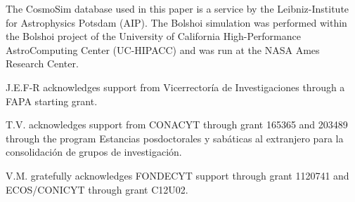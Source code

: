 \documentclass{emulateapj}
\begin{document}
The CosmoSim database used in this paper is a service by the
Leibniz-Institute for Astrophysics Potsdam (AIP). The  Bolshoi
simulation was performed within the Bolshoi project of the University
of California High-Performance AstroComputing Center (UC-HIPACC) and
was run at the NASA Ames Research Center. 

J.E.F-R acknowledges support from Vicerrector\'ia de
Investigaciones through a FAPA starting grant.

T.V. acknowledges support from CONACYT through grant 165365 and
203489 through the program Estancias posdoctorales y sab\'aticas al
extranjero para la consolidaci\'on de grupos de investigaci\'on.  

V.M. gratefully acknowledges FONDECYT support through grant 1120741
and ECOS/CONICYT through grant C12U02. 


 
\end{document}
